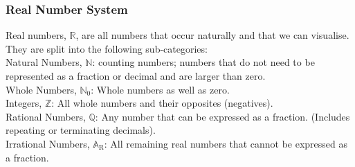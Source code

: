 \subsubsection{Real Number System}
Real numbers, $\mathbb{R}$, are all numbers that occur naturally and that we can visualise. They are split into the following sub-categories:\\
Natural Numbers, $\mathbb{N}$: counting numbers; numbers that do not need to be represented as a fraction or decimal and are larger than zero.\\
Whole Numbers, $\mathbb{N}_\mathrm{0}$: Whole numbers as well as zero.\\
Integers, $\mathbb{Z}$: All whole numbers and their opposites (negatives).\\
Rational Numbers, $\mathbb{Q}$: Any number that can be expressed as a fraction. (Includes repeating or terminating decimals).\\
Irrational Numbers, $\mathbb{A}_\mathrm{R}$: All remaining real numbers that cannot be expressed as a fraction.